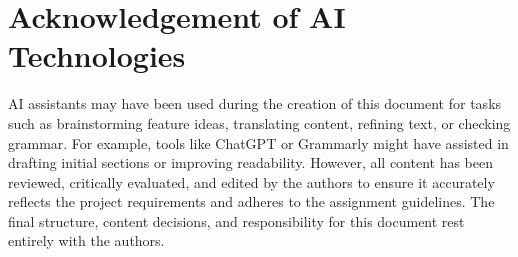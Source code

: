 \documentclass[a4paper,11pt]{article}
\begin{document}
\section*{Acknowledgement of AI Technologies}
AI assistants may have been used during the creation of this document for tasks such as brainstorming feature ideas, translating content, refining text, or checking grammar. For example, tools like ChatGPT or Grammarly might have assisted in drafting initial sections or improving readability. However, all content has been reviewed, critically evaluated, and edited by the authors to ensure it accurately reflects the project requirements and adheres to the assignment guidelines. The final structure, content decisions, and responsibility for this document rest entirely with the authors.
\end{document}
